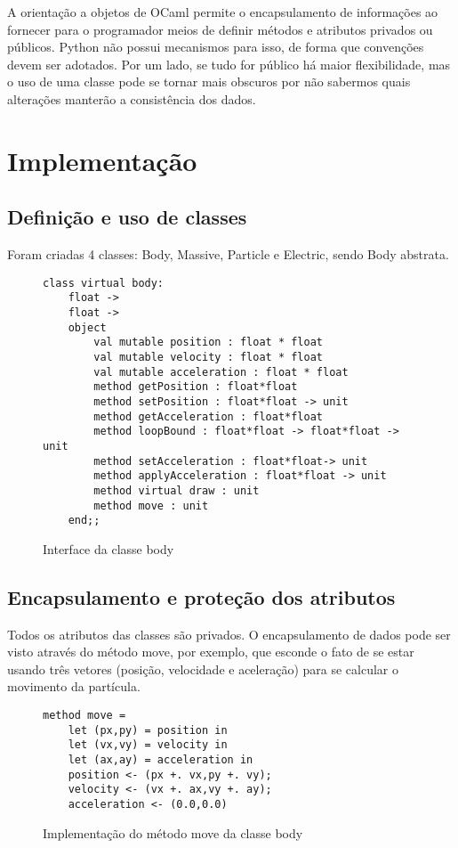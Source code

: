 \documentclass[a4paper,10pt]{article}
\begin{document}
	A orientação a objetos de OCaml permite o encapsulamento de informações ao fornecer para o programador meios de definir métodos e atributos privados ou públicos. Python não possui mecanismos para isso, de forma que convenções devem ser adotados. Por um lado, se tudo for público há maior flexibilidade, mas o uso de uma classe pode se tornar mais obscuros por não sabermos quais alterações manterão a consistência dos dados.
	
\section{Implementação}

\subsection{Definição e uso de classes}
	Foram criadas 4 classes: Body, Massive, Particle e Electric, sendo Body abstrata.
	\begin{figure}[H]
	\centering	
\begin{lstlisting}
class virtual body:
	float ->
	float ->
	object
		val mutable position : float * float
		val mutable velocity : float * float
		val mutable acceleration : float * float
		method getPosition : float*float
		method setPosition : float*float -> unit
		method getAcceleration : float*float
		method loopBound : float*float -> float*float -> unit
		method setAcceleration : float*float-> unit
		method applyAcceleration : float*float -> unit
		method virtual draw : unit
		method move : unit
	end;;
	\end{lstlisting}	
	\caption{Interface da classe body \label{Body}}
\end{figure}
	
\subsection{Encapsulamento e proteção dos atributos}
	Todos os atributos das classes são privados. O encapsulamento de dados pode ser visto através do método move, por exemplo, que esconde o fato de se estar usando três vetores (posição, velocidade e aceleração) para se calcular o movimento da partícula.
\begin{figure}[H]
	\centering	
	\begin{lstlisting}
method move =
	let (px,py) = position in
	let (vx,vy) = velocity in
	let (ax,ay) = acceleration in
	position <- (px +. vx,py +. vy);
	velocity <- (vx +. ax,vy +. ay);
	acceleration <- (0.0,0.0)
	\end{lstlisting}
	\caption{Implementação do método move da classe body}
\end{figure}
	
\end{document}
